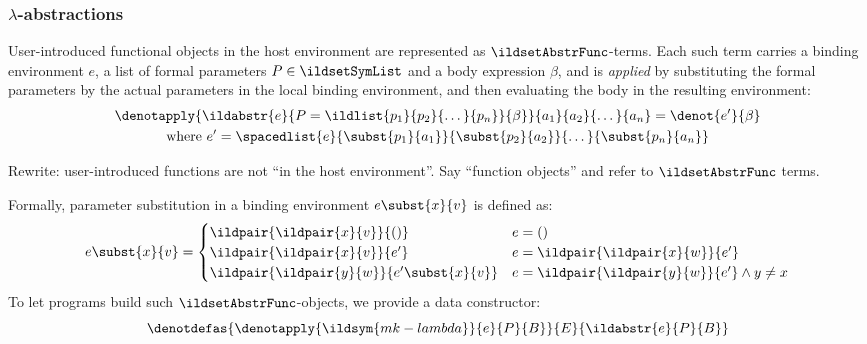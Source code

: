 \subsubsection{\texorpdfstring{\(\lambda\)-abstractions}{lambda-abstractions}}
\label{abstraction}
User-introduced functional objects in the host environment are
represented as \(\ildsetAbstrFunc\)-terms. Each such term carries a binding environment \(e\),
a list of formal parameters \(P \in \ildsetSymList\) and a body expression
\(\beta\), and is \emph{applied} by substituting the formal parameters by the
actual parameters in the local binding environment,
and then evaluating the body in the resulting environment:
\begin{equation}\begin{gathered}
  \denotapply{\ildabstr{e}{P = \ildlist{p_1}{p_2}{\dots}{p_n}}{\beta}}{a_1}{a_2}{\dots}{a_n} = \denot{e'}{\beta}
  \\
  \text{where } e' = \spacedlist{e}{\subst{p_1}{a_1}}{\subst{p_2}{a_2}}{\dots}{\subst{p_n}{a_n}}
\end{gathered}\end{equation}
\begin{note}
  Rewrite: user-introduced functions are not ``in the host environment''. Say
  ``function objects'' and refer to \(\ildsetAbstrFunc\) terms.
\end{note}
Formally, parameter substitution in a binding environment \(e\subst{x}{v}\) is defined as:
\begin{equation}
  e \subst{x}{v} =
  \begin{cases}
    \ildpair{\ildpair{x}{v}}{()} & e = () \\
    \ildpair{\ildpair{x}{v}}{e'} & e = \ildpair{\ildpair{x}{w}}{e'} \\
    \ildpair{\ildpair{y}{w}}{e' \subst{x}{v}} & e = \ildpair{\ildpair{y}{w}}{e'} \land y \neq x
  \end{cases}
\end{equation}
To let programs build such \(\ildsetAbstrFunc\)-objects, we provide a data constructor:
\begin{equation}
  \denotdefas{\denotapply{\ildsym{mk-lambda}}{e}{P}{B}}{E}{\ildabstr{e}{P}{B}}
\end{equation}

